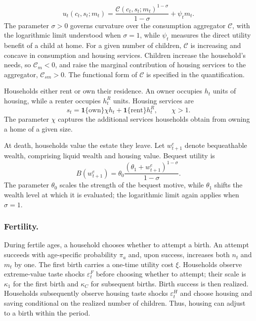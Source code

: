 \begin{equation*}
	u_t(c_t,s_t;m_t)
	=\frac{\mathcal C(c_t,s_t;m_t)^{1-\sigma}}{1-\sigma}
	+\psi_t m_t.
\end{equation*}
The parameter $\sigma>0$ governs curvature over the consumption aggregator
$\mathcal C$, with the logarithmic limit understood when $\sigma=1$, while
$\psi_t$ measures the direct utility benefit of a child at home.
For a given number of children, $\mathcal C$ is increasing and concave in
consumption and housing services. Children increase the household's needs,
so $\mathcal C_m<0$, and raise the marginal contribution of housing services
to the aggregator, $\mathcal C_{sm}>0$. The functional form of
$\mathcal C$ is specified in the quantification.

Households either rent or own their residence. An owner occupies $h_t$ units
of housing, while a renter occupies $h_t^R$ units. Housing services are
\begin{equation}
 s_t=\mathbf{1}\{\text{own}\}\chi h_t
     +\mathbf{1}\{\text{rent}\}h_t^R,
 \qquad \chi>1.
 \label{eq:env-housing-services}
\end{equation}
The parameter $\chi$ captures the additional services households obtain from
owning a home of a given size.

At death, households value the estate they leave. Let $w^e_{t+1}$ denote
bequeathable wealth, comprising liquid wealth and housing value. Bequest
utility is
\begin{equation}
 B(w^e_{t+1})
 =\theta_0\frac{(\theta_1+w^e_{t+1})^{1-\sigma}}{1-\sigma}.
 \label{eq:env-bequest-utility}
\end{equation}
The parameter $\theta_0$ scales the strength of the bequest motive, while
$\theta_1$ shifts the wealth level at which it is evaluated; the logarithmic
limit again applies when $\sigma=1$.

\subsubsection*{Fertility.}
During fertile ages, a household chooses whether to attempt a birth. An
attempt succeeds with age-specific probability $\pi_a$ and, upon success,
increases both $n_t$ and $m_t$ by one. The first birth carries a one-time
utility cost $\xi$. Households observe extreme-value taste shocks
$\varepsilon_t^F$ before choosing whether to attempt; their scale is
$\kappa_1$ for the first birth and $\kappa_C$ for subsequent births.
Birth success is then realized. Households subsequently observe housing
taste shocks $\varepsilon_t^H$ and choose housing and saving conditional on
the realized number of children. Thus, housing can adjust to a birth within
the period.

